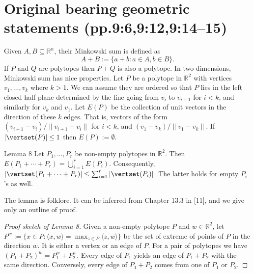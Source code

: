 \section*{Original bearing geometric statements (pp.9:6,9:12,9:14--15)}
Given $A,B\subseteq\mathbb R^n$, their Minkowski sum is defined as
\[A+B:=\{a+b:a\in A,b\in B\}.\]
If $P$ and $Q$ are polytopes then $P+Q$ is also a polytope. In two-dimensions, Minkowski sum has nice properties. Let $P$ be a polytope in $\mathbb R^2$ with vertices $v_1,\ldots,v_k$ where $k>1$. We can assume they are ordered so that $P$ lies in the left closed half plane determined by the line going from $v_i$ to $v_{i+1}$ for $i<k$, and similarly for $v_k$ and $v_1$. Let $E(P)$ be the collection of unit vectors in the direction of these $k$ edges. That is, vectors of the form $(v_{i+1}-v_i)/\|v_{i+1}-v_i\|$ for $i<k$, and $(v_1-v_k)/\|v_1-v_k\|$. If $|\vertset(P)|\le1$ then $E(P):=\emptyset$.
\begin{sourceresult}{Lemma 8}
Let $P_1,\ldots,P_r$ be non-empty polytopes in $\mathbb R^2$. Then $E(P_1+\cdots+P_r)=\bigcup_{i=1}^r E(P_i)$. Consequently, $|\vertset(P_1+\cdots+P_r)|\le\sum_{i=1}^r|\vertset(P_i)|$. The latter holds for empty $P_i$'s as well.
\end{sourceresult}
The lemma is folklore. It can be inferred from Chapter 13.3 in [11], and we give only an outline of proof.
\begin{proof}[Proof sketch of Lemma 8]
Given a non-empty polytope $P$ and $w\in\mathbb R^2$, let $P^w:=\{x\in P:\langle x,w\rangle=\max_{z\in P}\langle z,w\rangle\}$ be the set of extreme of points of $P$ in the direction $w$. It is either a vertex or an edge of $P$. For a pair of polytopes we have $(P_1+P_2)^w=P_1^w+P_2^w$. Every edge of $P_1$ yields an edge of $P_1+P_2$ with the same direction. Conversely, every edge of $P_1+P_2$ comes from one of $P_1$ or $P_2$.
\end{proof}

